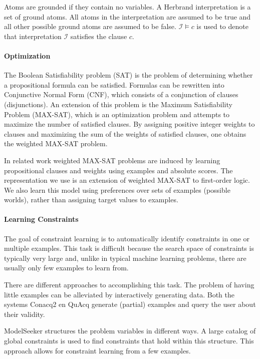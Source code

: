 \documentclass[letterpaper]{article}
\newcommand{\sym}[1]{\ensuremath{\mathcal{#1}}}
\theoremstyle{definition}
\begin{document}
Atoms are grounded if they contain no variables.
A Herbrand interpretation is a set of ground atoms.
All atoms in the interpretation are assumed to be true and all other possible ground atoms are assumed to be false.
$\sym{I} \models c$ is used to denote that interpretation \sym{I} satisfies the clause $c$.

\paragraph{Optimization}
The Boolean Satisfiability problem (SAT) is the problem of determining whether a propositional formula can be satisfied.
Formulas can be rewritten into Conjunctive Normal Form (CNF), which consists of a conjunction of clauses (disjunctions).
An extension of this problem is the Maximum Satisfiability Problem (MAX-SAT), which is an optimization problem and attempts to maximize the number of satisfied clauses.
By assigning positive integer weights to clauses and maximizing the sum of the weights of satisfied clauses, one obtains the weighted MAX-SAT problem.

In related work \cite{campigotto2011active} weighted MAX-SAT problems are induced by learning propositional clauses and weights using examples and absolute scores.
The representation we use is an extension of weighted MAX-SAT to first-order logic.
We also learn this model using preferences over sets of examples (possible worlds), rather than assigning target values to examples.

\paragraph{Learning Constraints}
The goal of constraint learning is to automatically identify constraints in one or multiple examples.
This task is difficult because the search space of constraints is typically very large and, unlike in typical machine learning problems, there are usually only few examples to learn from.

There are different approaches to accomplishing this task.
The problem of having little examples can be alleviated by interactively generating data.
Both the systems Conacq2 \cite{bessiere2007query} en QuAcq \cite{bessiere2013constraint} generate (partial) examples and query the user about their validity.

ModelSeeker \cite{Beldiceanu:ModelSeeker} structures the problem variables in different ways.
A large catalog of global constraints is used to find constraints that hold within this structure.
This approach allows for constraint learning from a few examples.
\end{document}
